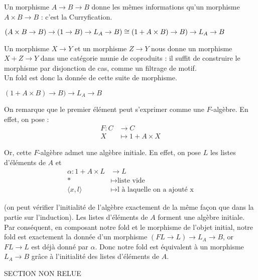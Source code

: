 \documentclass{article}
\begin{document}
Un morphisme $A \rightarrow B \rightarrow B$ donne les mêmes informations qu'un morphisme $ A \times B \rightarrow B$ : c'est la Curryfication. 

\begin{center}
    $(A \times B \rightarrow B) \rightarrow (1 \rightarrow B) \rightarrow L_A \rightarrow B) \cong \\ 
    (1 + A \times B ) \rightarrow B) \rightarrow L_A \rightarrow B  $
\end{center}
Un morphisme $X \rightarrow Y$ et un morphisme $ Z \rightarrow Y$ nous donne un morphisme $X + Z \rightarrow Y$ dans une catégorie munie de coproduits : il suffit de construire le morphisme par disjonction de cas, comme un filtrage de motif. \\ 

Un fold est donc la donnée de cette suite de morphisme. 
\begin{center}
    $ (1 + A \times B ) \rightarrow B) \rightarrow L_A \rightarrow B$ 
\end{center}

On remarque que le premier élément peut s'exprimer comme une $F$-algèbre. En effet, on pose :  
\begin{align*}
    F : C & \rightarrow C \\
        X & \mapsto 1 + A \times X 
\end{align*}

Or, cette $F$-algèbre admet une algèbre initiale. En effet, on pose $L$ les listes d'éléments de $A$ et 
\begin{align*}
    \alpha : 1 + A \times L & \rightarrow L \\ 
    * & \mapsto \text{liste vide} \\
    \langle x, l \rangle & \mapsto \text{l à laquelle on a ajouté x}
\end{align*}

(on peut vérifier l'initialité de l'algèbre exactement de la même façon que dans la partie sur l'induction). Les listes d'éléments de $A$ forment une algèbre initiale. Par conséquent, en composant notre fold et le morphisme de l'objet initial, notre fold est exactement la donnée  d'un morphisme $(FL \rightarrow L) \rightarrow L_A \rightarrow B $, or $FL \rightarrow L$ est déjà donné par $\alpha$. Donc notre fold est équivalent à un morphisme $L_A \rightarrow B$ grâce à l'initialité des listes d'éléments de $A$.



SECTION NON RELUE
\end{document}
